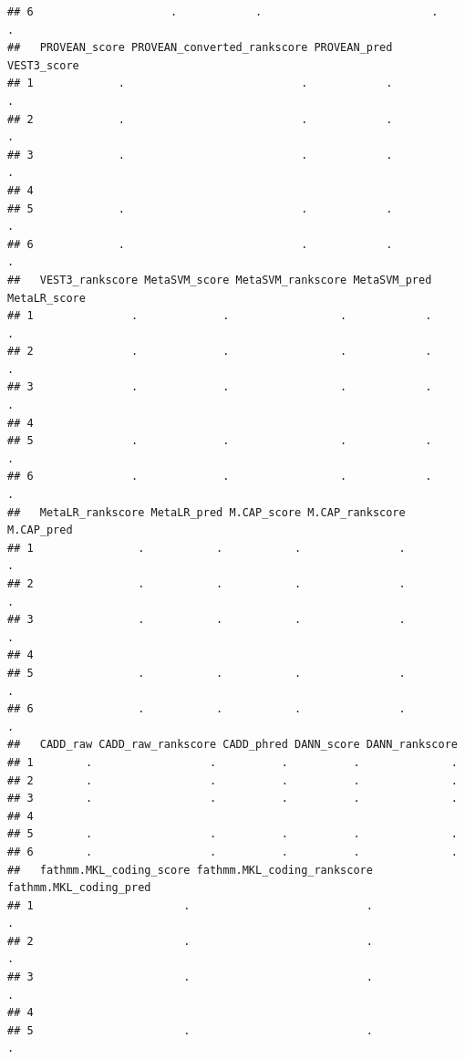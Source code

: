 \documentclass[
]{article}
\begin{document}
\begin{verbatim}
## 6                     .            .                          .           .
##   PROVEAN_score PROVEAN_converted_rankscore PROVEAN_pred VEST3_score
## 1             .                           .            .           .
## 2             .                           .            .           .
## 3             .                           .            .           .
## 4                                                                   
## 5             .                           .            .           .
## 6             .                           .            .           .
##   VEST3_rankscore MetaSVM_score MetaSVM_rankscore MetaSVM_pred MetaLR_score
## 1               .             .                 .            .            .
## 2               .             .                 .            .            .
## 3               .             .                 .            .            .
## 4                                                                          
## 5               .             .                 .            .            .
## 6               .             .                 .            .            .
##   MetaLR_rankscore MetaLR_pred M.CAP_score M.CAP_rankscore M.CAP_pred
## 1                .           .           .               .          .
## 2                .           .           .               .          .
## 3                .           .           .               .          .
## 4                                                                    
## 5                .           .           .               .          .
## 6                .           .           .               .          .
##   CADD_raw CADD_raw_rankscore CADD_phred DANN_score DANN_rankscore
## 1        .                  .          .          .              .
## 2        .                  .          .          .              .
## 3        .                  .          .          .              .
## 4                                                                 
## 5        .                  .          .          .              .
## 6        .                  .          .          .              .
##   fathmm.MKL_coding_score fathmm.MKL_coding_rankscore fathmm.MKL_coding_pred
## 1                       .                           .                      .
## 2                       .                           .                      .
## 3                       .                           .                      .
## 4                                                                           
## 5                       .                           .                      .

\end{verbatim}
\end{document}
